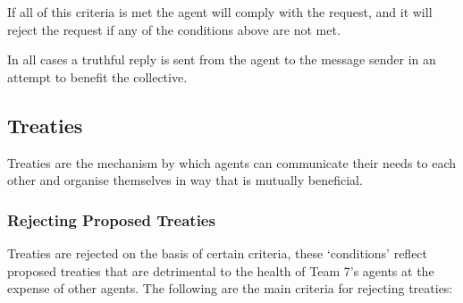 If all of this criteria is met the agent will comply with the request, and it will reject the request if any of the conditions above are not met.

In all cases a truthful reply is sent from the agent to the message sender in an attempt to benefit the collective.

\subsection{Treaties}
\label{subsec: Treaties}
Treaties are the mechanism by which agents can communicate their needs to each other and organise themselves in way that is mutually beneficial.  

\subsubsection{Rejecting Proposed Treaties}
\label{subsec: Rejecting Treaties}
Treaties are rejected on the basis of certain criteria, these `conditions' reflect proposed treaties that are detrimental to the health of Team 7's agents at the expense of other agents. The following are the main criteria for rejecting treaties:

